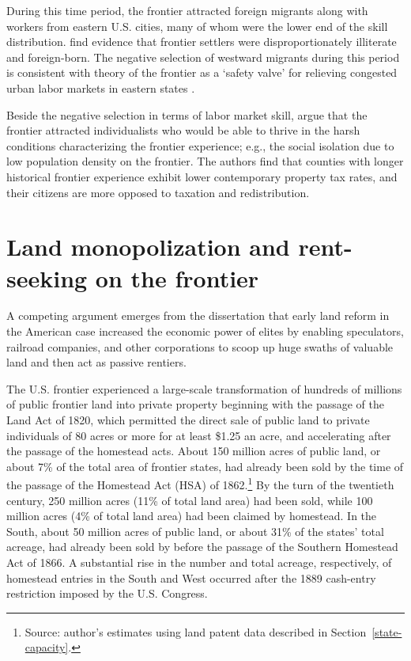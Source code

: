 During this time period, the frontier attracted foreign migrants along with workers from eastern U.S. cities, many of whom were the lower end of the skill distribution. \citet{bazzi2017frontier} find evidence that frontier settlers were disproportionately illiterate and foreign-born. The negative selection of westward migrants during this period is consistent with theory of the frontier as a `safety valve' for relieving congested urban labor markets in eastern states \citep{turner1956significance, ferrie1997migration}.

Beside the negative selection in terms of labor market skill, \citet{bazzi2017frontier} argue that the frontier attracted individualists who would be able to thrive in the harsh conditions characterizing the frontier experience; e.g., the social isolation due to low population density on the frontier. The authors find that counties with longer historical frontier experience exhibit lower contemporary property tax rates, and their citizens are more opposed to taxation and redistribution. 

\section{Land monopolization and rent-seeking on the frontier} 

A competing argument emerges from the dissertation that early land reform in the American case increased the economic power of elites by enabling speculators, railroad companies, and other corporations to scoop up huge swaths of valuable land and then act as passive rentiers.  

The U.S. frontier experienced a large-scale transformation of hundreds of millions of public frontier land into private property beginning with the passage of the Land Act of 1820, which permitted the direct sale of public land to private individuals of 80 acres or more for at least \$1.25 an acre, and accelerating after the passage of the homestead acts. About 150 million acres of public land, or about 7\% of the total area of frontier states, had already been sold by the time of the passage of the Homestead Act (HSA) of 1862.\footnote{Source: author's estimates using land patent data described in Section~\ref{state-capacity}.} By the turn of the twentieth century, 250 million acres (11\% of total land area) had been sold, while 100 million acres (4\% of total land area) had been claimed by homestead. In the South, about 50 million acres of public land, or about 31\% of the states' total acreage, had already been sold by before the passage of the Southern Homestead Act of 1866. A substantial rise in the number and total acreage, respectively, of homestead entries in the South and West occurred after the 1889 cash-entry restriction imposed by the U.S. Congress.

